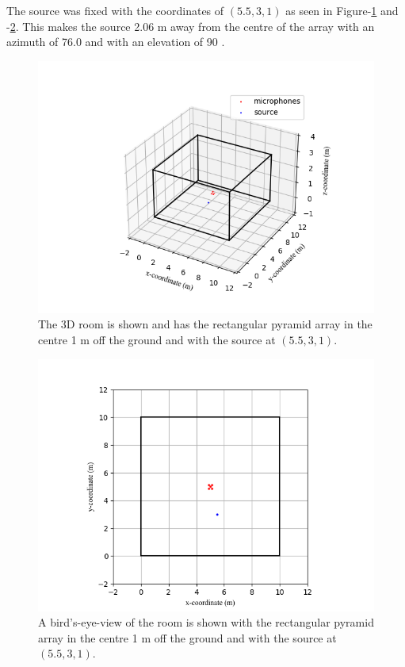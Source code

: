\documentclass[notitlepage]{report}
\begin{document}
The source was fixed with the coordinates of $(5.5,3,1)$ as seen in Figure-\ref{fig:pyramid_robot_room_3d} and -\ref{fig:pyramid_robot_room_2d}. This makes the source 2.06 \si{m} away from the centre of the array with an azimuth of 76.0 \si{\deg} and with an elevation of 90 \si{\deg}.

\begin{figure}[H]
\includegraphics[width=1\textwidth]{../Python/pyramid_robot/room_3d.png}
\centering
\caption{The 3D room is shown and has the rectangular pyramid array in the centre 1 \si{m} off the ground and with the source at $(5.5,3,1)$.}
\label{fig:pyramid_robot_room_3d}
\centering
\end{figure}

\begin{figure}[H]
\includegraphics[width=1\textwidth]{../Python/pyramid_robot/room_2d.png}
\centering
\caption{A bird's-eye-view of the room is shown with the rectangular pyramid array in the centre 1 \si{m} off the ground and with the source at $(5.5,3,1)$.}
\label{fig:pyramid_robot_room_2d}
\centering
\end{figure}
\end{document}
